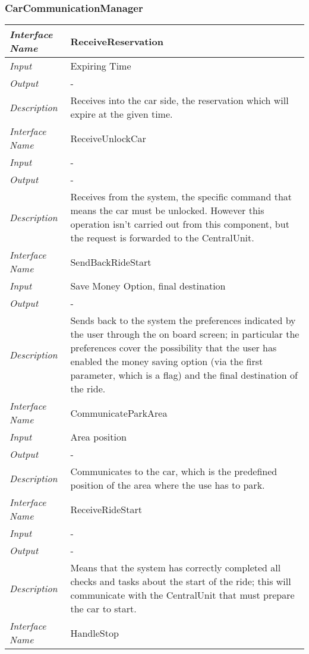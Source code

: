 \documentclass[11pt,a4paper]{report}
\begin{document}
\subsubsection{CarCommunicationManager}
\begin{tabularx}{\textwidth}{|>{\em}l|X|}
	\hline
	Interface Name& ReceiveReservation\\
	\hline
	Input & Expiring Time\\
	\hline
	Output & -\\
	\hline
	Description &Receives into the car side, the reservation which will expire at the given time.\\
	\hline
	\hline
	Interface Name& ReceiveUnlockCar\\
	\hline
	Input & -\\
	\hline
	Output & -\\
	\hline
	Description &Receives from the system, the specific command that means the car must be unlocked. However this operation isn't carried out from this component, but the request is forwarded to the CentralUnit. \\
	\hline
	\hline
	Interface Name& SendBackRideStart\\
	\hline
	Input & Save Money Option, final destination\\
	\hline
	Output & -\\
	\hline
	Description &Sends back to the system the preferences indicated by the user through the on board screen; in particular the preferences cover the possibility that the user has enabled the money saving option (via the first parameter, which is a flag) and the final destination of the ride.\\
	\hline
	\hline
	Interface Name& CommunicateParkArea\\
	\hline
	Input & Area position\\
	\hline
	Output & -\\
	\hline
	Description &Communicates to the car, which is the predefined position of the area where the use has to park.\\
	\hline
	\hline
	Interface Name& ReceiveRideStart\\
	\hline
	Input & -\\
	\hline
	Output & -\\
	\hline
	Description &Means that the system has correctly completed all checks and tasks about the start of the ride; this will communicate with the CentralUnit that must prepare the car to start.\\
	\hline
	\hline
	Interface Name& HandleStop\\

\end{tabularx}
\end{document}
